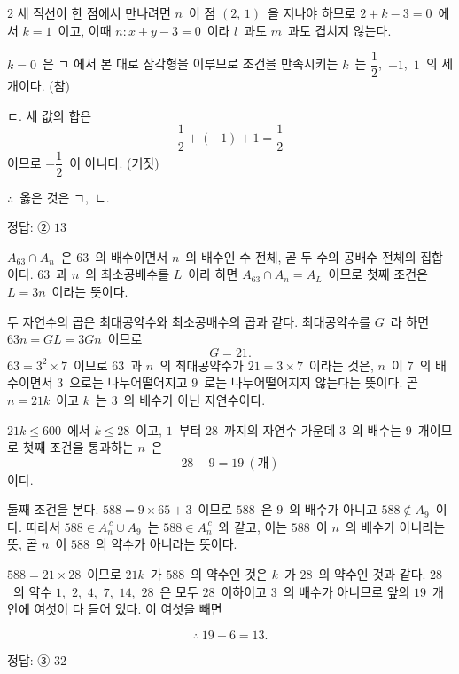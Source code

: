 \documentclass[10pt,fleqn]{article}
\begin{document}
\begin{multicols*}{2}
세 직선이 한 점에서 만나려면 $n$\ 이 점 $(2,\,1)$\ 을 지나야 하므로 $2+k-3=0$\ 에서 $k=1$\ 이고, 이때 $n:x+y-3=0$\ 이라 $l$\ 과도 $m$\ 과도 겹치지 않는다.

$k=0$\ 은 ㄱ 에서 본 대로 삼각형을 이루므로 조건을 만족시키는 $k$\ 는 $\dfrac12$,\ $-1$,\ $1$\ 의 세 개이다. (참)

ㄷ. 세 값의 합은
$$\dfrac12+(-1)+1=\dfrac12$$
이므로 $-\dfrac12$\ 이 아니다. (거짓)

$\therefore$\ 옳은 것은 ㄱ,\ ㄴ.


\begin{dmanswerbox}
정답: ② $13$
\end{dmanswerbox}

$A_{63}\cap A_{n}$\ 은 $63$\ 의 배수이면서 $n$\ 의 배수인 수 전체, 곧 두 수의 공배수 전체의 집합이다. $63$\ 과 $n$\ 의 최소공배수를 $L$\ 이라 하면 $A_{63}\cap A_{n}=A_{L}$\ 이므로 첫째 조건은 $L=3n$\ 이라는 뜻이다.

두 자연수의 곱은 최대공약수와 최소공배수의 곱과 같다. 최대공약수를 $G$\ 라 하면 $63n=GL=3Gn$\ 이므로
$$G=21.$$
$63=3^{2}\times 7$\ 이므로 $63$\ 과 $n$\ 의 최대공약수가 $21=3\times 7$\ 이라는 것은, $n$\ 이 $7$\ 의 배수이면서 $3$\ 으로는 나누어떨어지고 $9$\ 로는 나누어떨어지지 않는다는 뜻이다. 곧 $n=21k$\ 이고 $k$\ 는 $3$\ 의 배수가 아닌 자연수이다.

$21k\le 600$\ 에서 $k\le 28$\ 이고, $1$\ 부터 $28$\ 까지의 자연수 가운데 $3$\ 의 배수는 $9$\ 개이므로 첫째 조건을 통과하는 $n$\ 은
$$28-9=19\ (\text{개})$$
이다.

둘째 조건을 본다. $588=9\times 65+3$\ 이므로 $588$\ 은 $9$\ 의 배수가 아니고 $588\notin A_{9}$\ 이다. 따라서 $588\in A_{n}^{\,c}\cup A_{9}$\ 는 $588\in A_{n}^{\,c}$\ 와 같고, 이는 $588$\ 이 $n$\ 의 배수가 아니라는 뜻, 곧 $n$\ 이 $588$\ 의 약수가 아니라는 뜻이다.

$588=21\times 28$\ 이므로 $21k$\ 가 $588$\ 의 약수인 것은 $k$\ 가 $28$\ 의 약수인 것과 같다. $28$\ 의 약수 $1$,\ $2$,\ $4$,\ $7$,\ $14$,\ $28$\ 은 모두 $28$\ 이하이고 $3$\ 의 배수가 아니므로 앞의 $19$\ 개 안에 여섯이 다 들어 있다. 이 여섯을 빼면

$$\therefore\ 19-6=13.$$


\begin{dmanswerbox}
정답: ③ $32$
\end{dmanswerbox}


\end{multicols*}
\end{document}
